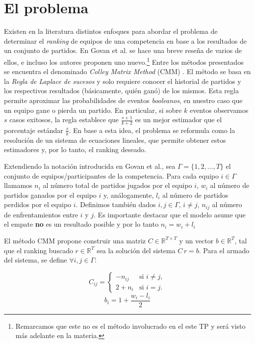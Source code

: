 \documentclass[11pt,a4paper]{article}
\begin{document}
\section*{El problema}

Existen en la literatura distintos enfoques para abordar el problema de determinar el \emph{ranking} de equipos de una competencia en
base a los resultados de un conjunto de partidos. 
En Govan et al.\cite{Govan2008} se hace una breve reseña de varios de ellos, e incluso los 
autores proponen uno nuevo.\footnote{Remarcamos que este no es el método involucrado en el este TP y será visto más adelante en la materia.}
Entre los métodos presentados se encuentra el denominado \emph{Colley Matrix Method} (CMM) \cite{Colley,Govan2008}. El método se basa en la \emph{Regla de Laplace de 
sucesos} y solo requiere conocer el historial de partidos y los respectivos resultados (básicamente, quién ganó) de los mismos. Esta regla 
permite aproximar las probabilidades de eventos \emph{booleanos}, en nuestro caso que un equipo gane o pierda un partido. En particular, si sobre 
$k$ eventos observamos $s$ casos exitosos, la regla establece que $\frac{s+1}{k+2}$ es un mejor estimador que el porcentaje estándar $\frac{s}{k}$. En base a esta
idea, el problema se reformula como la resolución de un sistema de ecuaciones lineales, que permite obtener estos estimadores y, por lo tanto, el ranking deseado.

Extendiendo la notación introducida en Govan et al.\cite{Govan2008}, sea $\Gamma = \{1,2,\dots,T\}$ el conjunto de equipos/participantes de la competencia.
Para cada equipo $i \in \Gamma$ llamamos $n_i$ al número total de partidos jugados por el equipo $i$, $w_i$ al número de partidos ganados por el
equipo $i$ y, análogamente, $l_i$ al número de partidos perdidos por el equipo $i$. Definimos también dados $i,j \in \Gamma$, $i \ne j$, $n_{ij}$ 
al número de enfrentamientos entre $i$ y $j$. Es importante destacar que el modelo asume que el empate \textbf{no} es un resultado posible y por lo tanto $n_i = w_i + l_i$

El método CMM propone construir una matriz $C \in \mathbb{R}^{T \times T}$ y un vector $b \in \mathbb{R}^T$, tal que el ranking buscado $r \in \mathbb{R}^T$
sea la solución del sistema $C \, r = b$. Para el armado del sistema, se define
$\forall i,j \in \Gamma$:

\begin{equation}
C_{ij} = \left\{
	\begin{array}{rl}
	-n_{ij} & \text{si } i \ne j,\\
	2 + n_i & \text{si } i = j.
	\end{array} \right.
\end{equation}
%
\begin{equation*}
b_i = 1 + \frac{w_i - l_i}{2}
\end{equation*}
\end{document}
